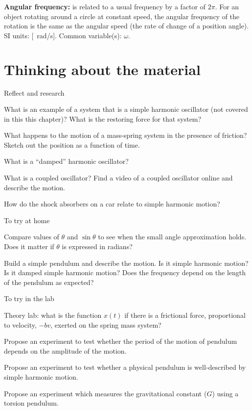 \begin{definitions}
\item \textbf{Angular frequency:} is related to a usual frequency by a factor of $2\pi$. For an object rotating around a circle at constant speed, the angular frequency of the rotation is the same as the angular speed (the rate of change of a position angle). SI units: [\SI{}{rad/s}]. Common variable(s): $\omega$.
\end{definitions}

\newpage
\section{Thinking about the material}

\begin{chapteractivity}{Reflect and research}
{
\item What is an example of a system that is a simple harmonic oscillator (not covered in this this chapter)? What is the restoring force for that system?
\item What happens to the motion of a mass-spring system in the presence of friction? Sketch out the position as a function of time.
\item What is a ``damped'' harmonic oscillator?
\item What is a coupled oscillator? Find a video of a coupled oscillator online and describe the motion.
\item How do the shock absorbers on a car relate to simple harmonic motion?
}
\end{chapteractivity}


\begin{chapteractivity}{To try at home}
{
\item Compare values of $\theta$ and $\sin\theta$ to see when the small angle approximation holds. Does it matter if $\theta$ is expressed in radians?
\item Build a simple pendulum and describe the motion. Is it simple harmonic motion? Is it damped simple harmonic motion? Does the frequency depend on the length of the pendulum as expected?
}
\end{chapteractivity}

\begin{chapteractivity}{To try in the lab}
{
\item Theory lab: what is the function $x(t)$ if there is a frictional force, proportional to velocity, $-bv$, exerted on the spring mass system?
\item Propose an experiment to test whether the period of the motion of pendulum depends on the amplitude of the motion.
\item Propose an experiment to test whether a physical pendulum is well-described by simple harmonic motion.

\item Propose an experiment which measures the gravitational constant ($G$) using a torsion pendulum.}
\end{chapteractivity}





